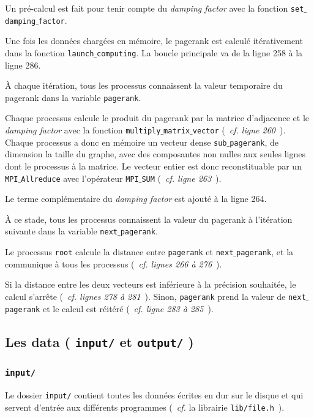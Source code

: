 \documentclass[a4paper,12pt]{article}
\begin{document}
\bigskip

Un pré-calcul est fait pour tenir compte du \textit{damping factor} avec la fonction \texttt{set$\_$damp\-ing$\_$factor}.

\bigskip

Une fois les données chargées en mémoire, le pagerank est calculé itérativement dans la fonction \texttt{launch$\_$computing}.
La boucle principale va de la ligne 258 à la ligne 286.

À chaque itération, tous les processus connaissent la valeur temporaire du pagerank dans la variable \texttt{pagerank}.

Chaque processus calcule le produit du pagerank par la matrice d'adjacence et le \textit{damping factor} avec la fonction \texttt{multiply$\_$matrix$\_$vector} (~\textit{cf. ligne 260}~). 
Chaque processus a donc en mémoire un vecteur dense \texttt{sub$\_$pagerank}, de dimension la taille du graphe, avec des composantes non nulles aux seules lignes dont le processus à la matrice. Le vecteur entier est donc reconstituable par un \texttt{MPI$\_$Allreduce} avec l'opérateur \texttt{MPI$\_$SUM} (~\textit{cf. ligne 263}~).

Le terme complémentaire du \textit{damping factor} est ajouté à la ligne 264.

À ce stade, tous les processus connaissent la valeur du pagerank à l'itération suivante dans la variable \texttt{next$\_$pagerank}.

Le processus \texttt{root} calcule la distance entre \texttt{pagerank} et \texttt{next$\_$pagerank}, et la communique à tous les processus (~\textit{cf. lignes 266 à 276}~).

Si la distance entre les deux vecteurs est inférieure à la précision souhaitée, le calcul s'arrête (~\textit{cf. lignes 278 à 281}~). 
Sinon, \texttt{pagerank} prend la valeur de \texttt{next$\_$pagerank} et le calcul est réitéré (~\textit{cf. ligne 283 à 285}~).
 
\subsection{Les data ( \texttt{input/} et \texttt{output/} )}

\subsubsection{\texttt{input/}}
\label{sec:input}

Le dossier \texttt{input/} contient toutes les données écrites en dur sur le disque et qui servent d'entrée aux différents programmes (~\textit{cf.} la librairie \texttt{lib/file.h}~).
\end{document}
